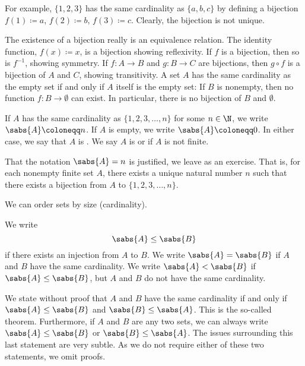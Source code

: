 For example, $\{ 1,2,3 \}$ has the same cardinality as $\{ a,b,c \}$ by
defining a bijection $f(1) \coloneqq a$, $f(2) \coloneqq b$, $f(3) \coloneqq c$.
Clearly, the bijection is not unique.

The existence of a bijection really is an equivalence relation.
The identity function, $f(x) \coloneqq x$, is a bijection showing reflexivity.
If $f$ is a bijection, then so is $f^{-1}$, showing symmetry.
If $f \colon A \to B$ and $g \colon B \to C$ are bijections, then
$g \circ f$ is a bijection of $A$ and $C$, showing transitivity.
A set $A$ has the same cardinality as the empty set if and only
if $A$ itself is the empty set:  If $B$ is nonempty, then
no function $f \colon B \to \emptyset$ can exist.
In particular, there is no bijection of $B$ and $\emptyset$.

\begin{defn}
If $A$ has the same cardinality as $\{ 1,2,3,\ldots,n \}$
for some $n \in \N$,
we write $\sabs{A} \coloneqq n$.  If $A$ is empty, we write
$\sabs{A} \coloneqq 0$.
In either case, we say that $A$ is
\emph{}.
We say $A$ is \emph{} or 
if $A$ is not finite.
\end{defn}

That the notation $\sabs{A} = n$ is justified, we leave as an exercise.  That
is, for each nonempty finite set $A$, there exists a unique natural number
$n$ such that there exists a bijection from $A$ to $\{ 1,2,3,\ldots,n \}$.

We can order sets by size (cardinality).

\begin{defn} \label{def:comparecards}
We write
\begin{equation*}
\sabs{A} \leq \sabs{B}
\end{equation*}
if there exists an injection from $A$ to $B$.  We write $\sabs{A} = \sabs{B}$
if $A$ and $B$ have the same cardinality.  We write $\sabs{A} < \sabs{B}$
if $\sabs{A} \leq \sabs{B}$, but $A$ and $B$ do not have the same cardinality.
\end{defn}

We state without proof that
$A$ and $B$ have the same cardinality if and only if
$\sabs{A} \leq \sabs{B}$ and
$\sabs{B} \leq \sabs{A}$.  This is the so-called
 theorem.
Furthermore, if $A$ and $B$ are any two sets,
we can always write $\sabs{A} \leq \sabs{B}$ or
$\sabs{B} \leq \sabs{A}$.  The issues surrounding this
last statement are very subtle.  As we do not require either
of these two statements, we omit proofs.

